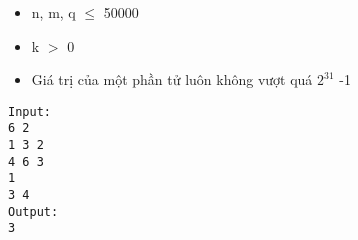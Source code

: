 \begin{itemize}
	\item     n, m, q  $\le$  50000   
	\item     k $>$ 0   
	\item     Giá trị của một phần tử luôn không vượt quá $2^{31}$    -1   
\end{itemize}
\begin{verbatim}
Input:
6 2
1 3 2
4 6 3
1
3 4
Output:
3
\end{verbatim}